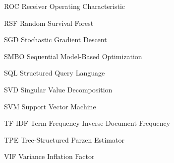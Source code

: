\begin{symbollist}
  \item[ROC] Receiver Operating Characteristic
  \item[RSF] Random Survival Forest
  \item[SGD] Stochastic Gradient Descent
  \item[SMBO] Sequential Model-Based Optimization
  \item[SQL] Structured Query Language
  \item[SVD] Singular Value Decomposition
  \item[SVM] Support Vector Machine
  \item[TF-IDF] Term Frequency-Inverse Document Frequency
  \item[TPE] Tree-Structured Parzen Estimator
  \item[VIF] Variance Inflation Factor
\end{symbollist}
